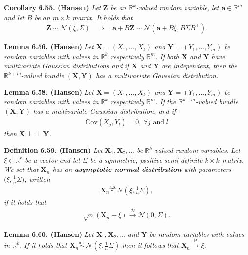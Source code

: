 \documentclass[
]{book}
\begin{document}
\textbf{Corollary 6.55. (Hansen)} \emph{Let \(\mathbf{Z}\) be an \(\mathbb{R}^k\)-valued random variable, let \(\mathbf{a}\in\mathbb{R}^m\) and let \(B\) be an \(m\times k\) matrix. It holds that}
\begin{align*}
    \mathbf{Z}\sim \mathcal{N}(\xi,\Sigma)\hspace{10pt}\Rightarrow\hspace{10pt} \mathbf{a}+B\mathbf{Z}\sim \mathcal{N}\left(\mathbf{a}+B\xi,B\Sigma B^\top\right).
\end{align*}

\textbf{Lemma 6.56. (Hansen)} \emph{Let \(\mathbf{X}=(X_1,...,X_k)\) and \(\mathbf{Y}=(Y_1,...,Y_m)\) be random variables with values in \(\mathbb{R}^k\) respectively \(\mathbb{R}^m\). If both \(\mathbf{X}\) and \(\mathbf{Y}\) have multivariate Gaussian distributions and if \(\mathbf{X}\) and \(\mathbf{Y}\) are independent, then the \(\mathbb{R}^{k+m}\)-valued bundle \((\mathbf{X},\mathbf{Y})\) has a multivariate Gaussian distribution.}

\textbf{Lemma 6.58. (Hansen)} \emph{Let \(\mathbf{X}=(X_1,...,X_k)\) and \(\mathbf{Y}=(Y_1,...,Y_m)\) be random variables with values in \(\mathbb{R}^k\) respectively \(\mathbb{R}^m\). If the \(\mathbb{R}^{k+m}\)-valued bundle \((\mathbf{X},\mathbf{Y})\) has a multivariate Gaussian distribution, and if}
\begin{align*}
    \text{Cov}(X_j,Y_l)=0,\ \forall j\text{ and }l
\end{align*}
\emph{then \(\mathbf{X}\perp \!\!\! \perp\mathbf{Y}\).}

\textbf{Definition 6.59. (Hansen)} \emph{Let \(\mathbf{X}_1,\mathbf{X}_2,...\) be \(\mathbb{R}^k\)-valued random variables. Let \(\xi\in\mathbb{R}^k\) be a vector and let \(\Sigma\) be a symmetric, positive semi-definite \(k\times k\) matrix.}
\emph{We sat that \(\mathbf{X}_n\) has an \textbf{asymptotic normal distribution} with parameters \(\big(\xi,\frac{1}{n}\Sigma\big)\), written}
\begin{align*}
    \mathbf{X}_n\stackrel{\text{a.s.}}{\sim}\mathcal{N}\left(\xi,\frac{1}{n}\Sigma\right),
\end{align*}
\emph{if it holds that}
\begin{align*}
    \sqrt{n}(\mathbf{X}_n-\xi)\stackrel{\mathcal{D}}{\to} \mathcal{N}(0,\Sigma).
\end{align*}

\textbf{Lemma 6.60. (Hansen)} \emph{Let \(\mathbf{X}_1,\mathbf{X}_2,...\) and \(\mathbf{Y}\) be random variables with values in \(\mathbb{R}^k\). If it holds that \(\mathbf{X}_n\stackrel{\text{a.s.}}{\sim} \mathcal{N}(\xi,\frac{1}{n}\Sigma)\) then it follows that \(\mathbf{X}_n\stackrel{\text{P}}{\to}\xi\).}
\end{document}
